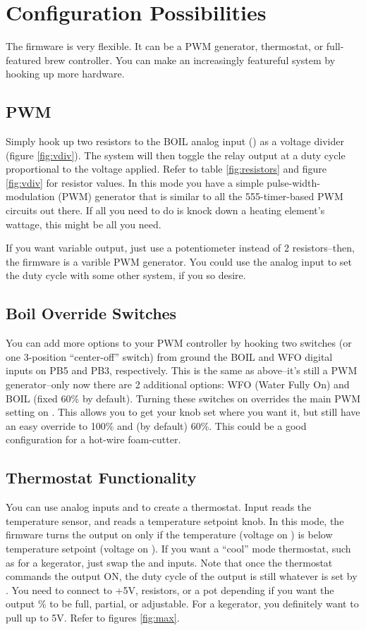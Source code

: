 \documentclass[dvips,12pt]{article}
\begin{document}
\section{Configuration Possibilities}

The firmware is very flexible. It can be a PWM generator, thermostat, or full-featured brew controller. You can make an increasingly featureful system by hooking up more hardware. 

\subsection{PWM}
Simply hook up two resistors to the BOIL analog input (\duty) as a voltage divider (figure \ref{fig:vdiv}). The system
will then toggle the relay output \relay{} at a duty cycle proportional to the voltage applied. Refer to table
\ref{fig:resistors} and figure \ref{fig:vdiv} for resistor values. In this mode you have a
simple pulse-width-modulation (PWM) generator that is similar to all the 555-timer-based PWM circuits out there. If all you need to do is knock down a heating element's wattage, this might be all you need. 

If you want variable output, just use a potentiometer instead of 2 resistors--then, the
firmware is a varible PWM generator. You could use the analog input to set the duty cycle with
some other system, if you so desire.

\subsection{Boil Override Switches} 
You can add more options to your PWM controller by hooking two switches (or one 3-position ``center-off'' switch) from
ground the BOIL and WFO digital inputs on PB5 and PB3, respectively. This is the same as above--it's still a PWM
generator--only now there are 2 additional options: WFO (Water Fully On) and BOIL (fixed 60\% by default).  Turning these
switches on overrides the main PWM setting on \duty. This allows you to get your knob set where you want it, but still
have an easy override to 100\% and (by default) 60\%. This could be a good configuration for a hot-wire foam-cutter. 

\subsection{Thermostat Functionality} 
You can use analog inputs \probe{} and \temp{} to create a thermostat. Input \probe{} reads the temperature sensor, and
\temp{} reads a temperature setpoint knob. In this mode, the firmware turns the output on only if the temperature
(voltage on \probe) is below temperature setpoint (voltage on \temp). If you want a ``cool'' mode thermostat, such as for
a kegerator, just swap the \temp{} and \probe{} inputs. Note that once the thermostat commands the output ON, the duty
cycle of the output is still whatever is set by \duty. You need to connect \duty{} to +5V, resistors, or a pot depending
if you want the output \% to be full, partial, or adjustable. For a kegerator, you definitely want to pull \duty{} up to
5V. Refer to figures \ref{fig:max}.
\end{document}
